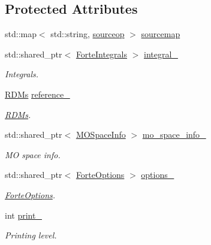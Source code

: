 \subsection*{Protected Attributes}
\begin{DoxyCompactItemize}
\item 
std\+::map$<$ std\+::string, \mbox{\hyperlink{classforte_1_1_m_c_s_r_g_p_t2___m_o_a541d16aa14bd6d3e685b6bda0b8602f1}{sourceop}} $>$ \mbox{\hyperlink{classforte_1_1_m_c_s_r_g_p_t2___m_o_a8edcac7af48fd15aba27a90b30e57940}{sourcemap}}
\item 
std\+::shared\+\_\+ptr$<$ \mbox{\hyperlink{classforte_1_1_forte_integrals}{Forte\+Integrals}} $>$ \mbox{\hyperlink{classforte_1_1_m_c_s_r_g_p_t2___m_o_ab7f3aa76186b95d2047cf92cbb0f4eeb}{integral\+\_\+}}
\begin{DoxyCompactList}\small\item\em Integrals. \end{DoxyCompactList}\item 
\mbox{\hyperlink{classforte_1_1_r_d_ms}{R\+D\+Ms}} \mbox{\hyperlink{classforte_1_1_m_c_s_r_g_p_t2___m_o_a13dfc425a4eedd0fee06df5f97add808}{reference\+\_\+}}
\begin{DoxyCompactList}\small\item\em \mbox{\hyperlink{classforte_1_1_r_d_ms}{R\+D\+Ms}}. \end{DoxyCompactList}\item 
std\+::shared\+\_\+ptr$<$ \mbox{\hyperlink{classforte_1_1_m_o_space_info}{M\+O\+Space\+Info}} $>$ \mbox{\hyperlink{classforte_1_1_m_c_s_r_g_p_t2___m_o_a0cc34cc42dfc9e286b55f723f8ffbcb0}{mo\+\_\+space\+\_\+info\+\_\+}}
\begin{DoxyCompactList}\small\item\em MO space info. \end{DoxyCompactList}\item 
std\+::shared\+\_\+ptr$<$ \mbox{\hyperlink{classforte_1_1_forte_options}{Forte\+Options}} $>$ \mbox{\hyperlink{classforte_1_1_m_c_s_r_g_p_t2___m_o_ac5db188d4d2d45bff7d2ee843eef15a2}{options\+\_\+}}
\begin{DoxyCompactList}\small\item\em \mbox{\hyperlink{classforte_1_1_forte_options}{Forte\+Options}}. \end{DoxyCompactList}\item 
int \mbox{\hyperlink{classforte_1_1_m_c_s_r_g_p_t2___m_o_ad7fb479ce571b84b53b6006c20c567e6}{print\+\_\+}}
\begin{DoxyCompactList}\small\item\em Printing level. \end{DoxyCompactList}\item 

\end{DoxyCompactItemize}
